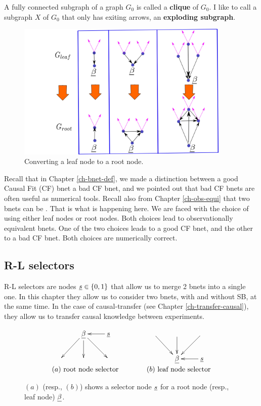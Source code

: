 A fully connected subgraph of 
a graph $G_0$ is called a 
{\bf clique} of $G_0$.
I like to call a subgraph $X$  of $G_0$ that only has exiting arrows, an 
{\bf exploding subgraph}.



\begin{figure}[h!]
\centering
\includegraphics[width=4in]
{sb-removal/sel-nd-reversal.png}
\caption{Converting 
a leaf node
to a root node.}
\label{fig-sel-nd-reversal}
\end{figure}

Recall that in Chapter \ref{ch-bnet-def},
we made a distinction
between a good Causal Fit (CF) bnet
a bad CF bnet, and
we pointed out
that bad CF bnets are
often useful as
numerical tools.
Recall also from Chapter
\ref{ch-obs-equi}
that two bnets can be
.
That is what is happening here.
We are faced with
the choice of
using
either
leaf nodes or root nodes.
Both
choices  lead to observationally
equivalent bnets.
One of the two choices
leads to a good
CF bnet,
and the other to a bad CF bnet.
Both choices are numerically
correct.

\subsection{R-L selectors}
R-L selectors are nodes 
$\rvs\in \bool$ that allow us to merge 2 bnets into a single one. In this chapter they allow us 
to consider two bnets, with and without SB, at the same time.
In the case of causal-transfer (see Chapter \ref{ch-transfer-causal}), they
allow us
 to transfer causal knowledge
between experiments.


\begin{figure}[h!]
$$
\begin{array}{ccc}
\xymatrix{
&\rvbeta\ar[dl]\ar[d]\ar[dr]&\rvs\ar[l]
\\
&&
}
&\quad\quad&
\xymatrix{
\ar[dr]&\ar[d]&\ar[dl]
\\
&\rvbeta&\rvs\ar[l]
}
\\
(a)\text{ root node selector} 
&& (b)\text{ leaf node selector}
\end{array}
$$
\caption{$(a)$ (resp., $(b)$) shows a selector node $\rvs$ for a
root node (resp., leaf node) $\rvbeta$.}
\label{fig-rl-selectors}
\end{figure}

